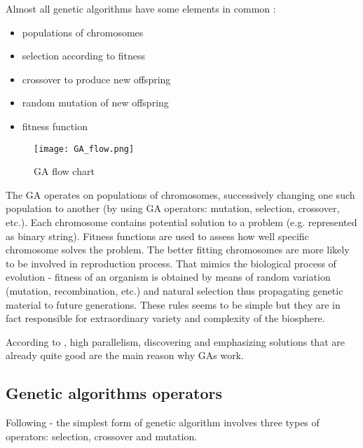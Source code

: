 Almost all genetic algorithms have some elements in common \cite{Mitchell01}:
\begin{itemize}
  \item populations of chromosomes
  \item selection according to fitness
  \item crossover to produce new offspring
  \item random mutation of new offspring
  \item fitness function
\end{itemize}

\begin{figure}[H]
  \begin{center}
    \texttt{[image: GA\_flow.png]}
  \end{center}
  \caption{GA flow chart \cite{Haupt:2004:PGA:1007746}}
\end{figure}

The GA operates on populations of chromosomes, successively changing one such population to another (by using GA operators: mutation, selection, crossover, etc.). 
Each chromosome contains potential solution to a problem (e.g. represented as binary string). 
Fitness functions are used to assess how well specific chromosome solves the problem.
The better fitting chromosomes are more likely to be involved in reproduction process.
That mimics the biological process of evolution - fitness of an organism is obtained by means of random variation (mutation, recombination, etc.) and natural selection
thus propagating genetic material to future generations.
These rules seems to be simple but they are in fact responsible for extraordinary variety and complexity of the biosphere.
\cite{Mitchell01} 
 
According to \cite{Mitchell01} , high parallelism, discovering and emphasizing solutions that are already quite good are the main reason why GAs work.  
 

\subsection{Genetic algorithms operators}

Following \cite{Mitchell01} - the simplest form of genetic algorithm involves three types of operators: selection, crossover and mutation. 

